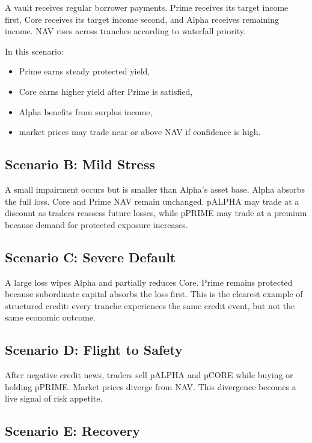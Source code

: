 \documentclass[11pt]{article}
\begin{document}
A vault receives regular borrower payments. Prime receives its target income
first, Core receives its target income second, and Alpha receives remaining
income. NAV rises across tranches according to waterfall priority.

In this scenario:

\begin{itemize}
  \item Prime earns steady protected yield,
  \item Core earns higher yield after Prime is satisfied,
  \item Alpha benefits from surplus income,
  \item market prices may trade near or above NAV if confidence is high.
\end{itemize}

\subsection{Scenario B: Mild Stress}

A small impairment occurs but is smaller than Alpha's asset base. Alpha absorbs
the full loss. Core and Prime NAV remain unchanged. pALPHA may trade at a
discount as traders reassess future losses, while pPRIME may trade at a premium
because demand for protected exposure increases.

\subsection{Scenario C: Severe Default}

A large loss wipes Alpha and partially reduces Core. Prime remains protected
because subordinate capital absorbs the loss first. This is the clearest example
of structured credit: every tranche experiences the same credit event, but not
the same economic outcome.

\subsection{Scenario D: Flight to Safety}

After negative credit news, traders sell pALPHA and pCORE while buying or holding
pPRIME. Market prices diverge from NAV. This divergence becomes a live signal of
risk appetite.

\subsection{Scenario E: Recovery}
\end{document}
